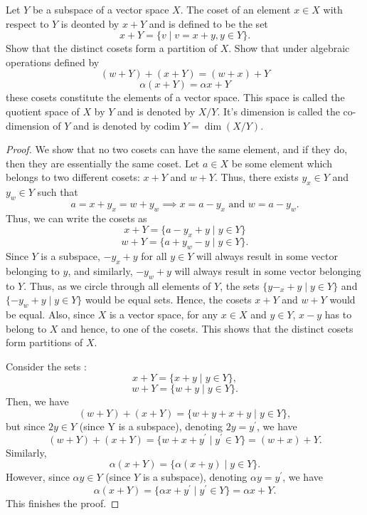 \begin{question}
    Let $Y$ be a subspace of a vector space $X$. The coset of an element $x \in X$ with respect to $Y$ is deonted by $x + Y$ and is defined to be the set
    \[x + Y = \{v \mid v = x + y , y \in Y\}.\]
    Show that the distinct cosets form a partition of $X$. Show that under algebraic operations defined by 
    \[(w+Y) + (x+Y) = (w + x) + Y\]
    \[\alpha(x + Y) = \alpha x + Y\]
    these cosets constitute the elements of a vector space. This space is called the quotient space of $X$ by $Y$ and is denoted by $X/ Y$. It's dimension is called the co-dimension of $Y$ and is denoted by $\textrm{codim}\; Y = \dim (X/Y)$.
    \label{section2.1-14}
\end{question}
\begin{proof}
   We show that no two cosets can have the same element, and if they do, then they are essentially the same coset. Let $a \in X$ be some element which belongs to two different cosets: $x + Y$ and $w + Y$. Thus, there exists $y_x \in Y$ and $y_w \in Y$ such that
   \[a = x + y_x = w + y_w \implies x = a - y_x \text{ and } w = a - y_w.\]
   Thus, we can write the cosets as
   \[x + Y = \{a - y_x + y \mid y \in Y\}\]
   \[w + Y = \{a + y_w - y \mid y \in Y\}.\]
    Since $Y$ is a subspace, $-y_x + y$ for all $y \in Y$ will always result in some vector belonging to $y$, and similarly, $-y_w + y$ will always result in some vector belonging to $Y$. Thus, as we circle through all elements of $Y$, the sets $\{y-_x + y \mid y \in Y\}$ and $\{-y_w + y \mid y \in Y\}$ would be equal sets. Hence, the cosets $x + Y$ and $w + Y$ would be equal. Also, since $X$ is a vector space, for any $x \in X$ and $y \in Y$, $x - y$ has to belong to $X$ and hence, to one of the cosets. This shows that the distinct cosets form partitions of $X$.

    Consider the sets :
    \[x + Y = \{x + y \mid y \in Y\},\]
    \[w + Y = \{w + y \mid y \in Y\}.\]
    Then, we have
    \[(w + Y) + (x + Y) = \{w + y + x + y \mid y \in Y\},\]
    but since $2y \in Y$ (since Y is a subspace), denoting $2y = y^\prime$, we have
    \[(w + Y) + (x + Y) = \{w + x + y^\prime \mid y^\prime \in Y\} = (w+x) + Y.\]
    Similarly, 
    \[\alpha(x + Y) = \{\alpha(x + y) \mid y \in Y\}.\]
    However, since $\alpha y \in Y$ (since $Y$ is a subspace), denoting $\alpha y = y^\prime$, we have
    \[\alpha(x + Y) = \{\alpha x + y^\prime \mid y^\prime \in Y\} = \alpha x + Y.\]
    This finishes the proof.
\end{proof}

